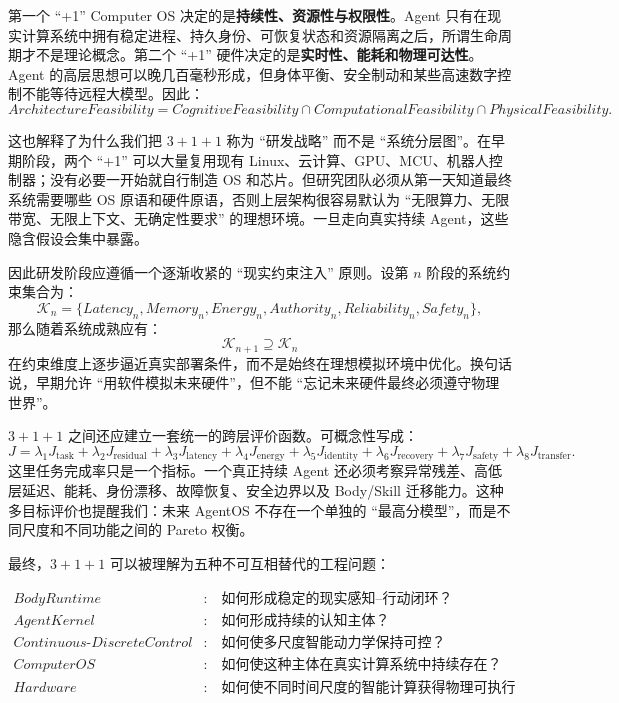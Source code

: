 第一个 ``+1'' Computer OS 决定的是\textbf{持续性、资源性与权限性}。Agent 只有在现实计算系统中拥有稳定进程、持久身份、可恢复状态和资源隔离之后，所谓生命周期才不是理论概念。第二个 ``+1'' 硬件决定的是\textbf{实时性、能耗和物理可达性}。Agent 的高层思想可以晚几百毫秒形成，但身体平衡、安全制动和某些高速数字控制不能等待远程大模型。因此：
\[
\boxed{
ArchitectureFeasibility
=
CognitiveFeasibility
\cap
ComputationalFeasibility
\cap
PhysicalFeasibility.
}
\]

这也解释了为什么我们把 $3+1+1$ 称为 ``研发战略'' 而不是 ``系统分层图''。在早期阶段，两个 ``+1'' 可以大量复用现有 Linux、云计算、GPU、MCU、机器人控制器；没有必要一开始就自行制造 OS 和芯片。但研究团队必须从第一天知道最终系统需要哪些 OS 原语和硬件原语，否则上层架构很容易默认为 ``无限算力、无限带宽、无限上下文、无确定性要求'' 的理想环境。一旦走向真实持续 Agent，这些隐含假设会集中暴露。

因此研发阶段应遵循一个逐渐收紧的 ``现实约束注入'' 原则。设第 $n$ 阶段的系统约束集合为：
\[
\mathcal K_n
=
\{
Latency_n,
Memory_n,
Energy_n,
Authority_n,
Reliability_n,
Safety_n
\},
\]
那么随着系统成熟应有：
\[
\mathcal K_{n+1}
\supseteq
\mathcal K_n
\]
在约束维度上逐步逼近真实部署条件，而不是始终在理想模拟环境中优化。换句话说，早期允许 ``用软件模拟未来硬件''，但不能 ``忘记未来硬件最终必须遵守物理世界''。

$3+1+1$ 之间还应建立一套统一的跨层评价函数。可概念性写成：
\[
J
=
\lambda_1J_{\mathrm{task}}
+
\lambda_2J_{\mathrm{residual}}
+
\lambda_3J_{\mathrm{latency}}
+
\lambda_4J_{\mathrm{energy}}
+
\lambda_5J_{\mathrm{identity}}
+
\lambda_6J_{\mathrm{recovery}}
+
\lambda_7J_{\mathrm{safety}}
+
\lambda_8J_{\mathrm{transfer}}.
\]
这里任务完成率只是一个指标。一个真正持续 Agent 还必须考察异常残差、高低层延迟、能耗、身份漂移、故障恢复、安全边界以及 Body/Skill 迁移能力。这种多目标评价也提醒我们：未来 AgentOS 不存在一个单独的 ``最高分模型''，而是不同尺度和不同功能之间的 Pareto 权衡。

最终，$3+1+1$ 可以被理解为五种不可互相替代的工程问题：

\[
\begin{aligned}
BodyRuntime &: \quad
\text{如何形成稳定的现实感知--行动闭环？}\\
AgentKernel &: \quad
\text{如何形成持续的认知主体？}\\
Continuous\text{-}DiscreteControl &: \quad
\text{如何使多尺度智能动力学保持可控？}\\
ComputerOS &: \quad
\text{如何使这种主体在真实计算系统中持续存在？}\\
Hardware &: \quad
\text{如何使不同时间尺度的智能计算获得物理可执行性？}
\end{aligned}
\]

